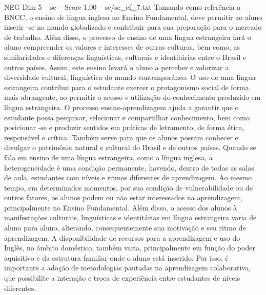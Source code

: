 \begin{textsample}{NEG Dim 5 – se – Score 1.00 – se/se\_ef\_7.txt}
Tomando como referência a BNCC, o ensino de língua inglesa no Ensino Fundamental, deve permitir ao aluno inserir -se no mundo globalizado e contribuir para sua preparação para o mercado de trabalho.
Além disso, o processo de ensino de uma língua estrangeira fará o aluno compreender os valores e interesses de outras culturas, bem como, as similaridades e diferenças linguísticas, culturais e identitárias entre o Brasil e outros países.
Assim, este ensino levará o aluno a perceber e valorizar a diversidade cultural, linguística do mundo contemporâneo.
O uso de uma língua estrangeira contribui para o estudante exercer o protagonismo social de forma mais abrangente, ao permitir o acesso e utilização do conhecimento produzido em língua estrangeira.
O processo ensino-aprendizagem ajuda a garantir que o estudante possa pesquisar, selecionar e compartilhar conhecimento, bem como posicionar -se e produzir sentidos em práticas de letramento, de forma ética, responsável e crítica.
Também serve para que os alunos possam conhecer e divulgar o patrimônio natural e cultural do Brasil e de outros países.
Quando se fala em ensino de uma língua estrangeira, como a língua inglesa, a heterogeneidade é uma condição permanente, havendo, dentro de todas as salas de aula, estudantes com níveis e ritmos diferentes de aprendizagem.
Ao mesmo tempo, em determinados momentos, por sua condição de vulnerabilidade ou de outros fatores, os alunos podem ou não estar interessados na aprendizagem, principalmente no Ensino Fundamental.
Além disso, o acesso dos alunos à manifestações culturais, linguísticas e identitárias em língua estrangeira varia de aluno para aluno, alterando, consequentemente sua motivação e seu ritmo de aprendizagem.
A disponibilidade de recursos para a aprendizagem e uso do Inglês, no âmbito doméstico, também varia, principalmente em função do poder aquisitivo e da estrutura familiar onde o aluno está inserido.
Por isso, é importante a adoção de metodologias pautadas na aprendizagem colaborativa, que possibilite a interação e troca de experiência entre estudantes de níveis diferentes.

\end{textsample}
